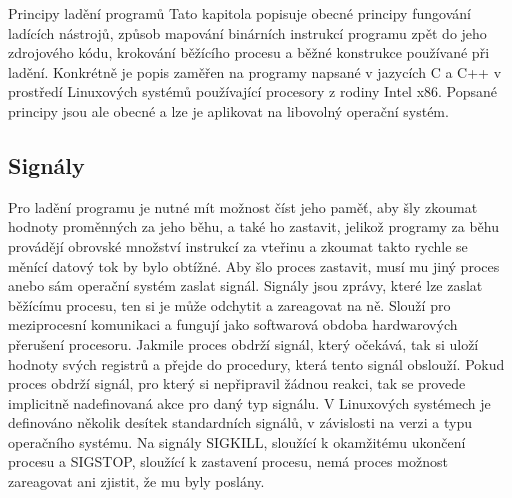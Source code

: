 \documentclass[bc,male,python,dept460]{diploma}						%
\begin{document}
\begin{section}{Principy ladění programů}
\label{sec:DebuggingPrinciples}
	Tato kapitola popisuje obecné principy fungování ladících nástrojů, způsob mapování binárních instrukcí programu zpět do jeho zdrojového kódu,
	krokování běžícího procesu a běžné konstrukce používané při ladění. Konkrétně je popis zaměřen na programy napsané v jazycích C a C++
	v prostředí Linuxových systémů používající procesory z rodiny Intel x86. %
	Popsané principy jsou ale obecné a lze je aplikovat na libovolný operační systém.
		
	\subsection{Signály}
		Pro ladění programu je nutné mít možnost číst jeho paměť, aby šly zkoumat hodnoty proměnných za jeho běhu, a také ho zastavit, jelikož
		programy za běhu provádějí obrovské množství instrukcí za vteřinu a zkoumat takto rychle se měnící datový tok by bylo obtížné.
		Aby šlo proces zastavit, musí mu jiný proces anebo sám operační systém zaslat signál.
		Signály jsou zprávy, které lze zaslat běžícímu procesu, ten si je může odchytit a zareagovat na ně.\cite[21]{tanenbaum}
		Slouží pro meziprocesní komunikaci a fungují jako softwarová obdoba hardwarových přerušení procesoru.
		Jakmile proces obdrží signál, který očekává, tak si uloží hodnoty svých registrů a přejde do procedury, která tento signál obslouží.
		Pokud proces obdrží signál, pro který si nepřipravil žádnou reakci, tak se provede implicitně nadefinovaná akce pro daný typ signálu.
		V Linuxových systémech je definováno několik desítek standardních signálů, v závislosti na verzi a typu operačního systému.
		Na signály SIGKILL, sloužící k okamžitému ukončení procesu a SIGSTOP, sloužící k zastavení procesu, nemá proces možnost zareagovat ani
		zjistit, že mu byly poslány.
	

\end{section}
\end{document}
